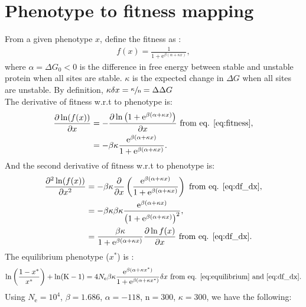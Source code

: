 \documentclass{article}
\newcommand{\e}{\mathrm{e}}
\newcommand{\Ne}{N_{\mathrm{e}}}
\newcommand{\Nsite}{\text{n}}
\newcommand{\Nstate}{\text{K}}
\newcommand{\x}{x}
\newcommand{\eq}{^{*}}
\newcommand{\dx}{\delta \x}
\begin{document}
\section*{Phenotype to fitness mapping}
From a given phenotype $\x$, define the fitness as :
\begin{gather}
 f(\x) = \frac{1}{1 + \e^{\beta(\alpha + \kappa \x)}}, \label{eq:fitness}
\end{gather}
where $\alpha = \Delta G_0 < 0$ is the difference in free energy between stable and unstable protein when all sites are stable. $\kappa$ is the expected change in $\Delta G$ when all sites are unstable. By definition, $\kappa \dx = \sfrac{\kappa}{\Nsite} = \Delta \Delta G $\\
The derivative of fitness w.r.t to phenotype is:
\begin{align}
 \frac{\partial \ln (f(\x))}{\partial \x}  & = - \frac{\partial \ln \left( 1 + \e^{\beta(\alpha + \kappa \x)} \right)}{\partial \x} \text{ from eq. \ref{eq:fitness}}, \\
 & = - \beta \kappa \frac{\e^{\beta(\alpha + \kappa \x)}}{1 + \e^{\beta(\alpha + \kappa \x)}} \label{eq:df_dx}.
\end{align}
And the second derivative of fitness w.r.t to phenotype is:
\begin{align}
\frac{\partial^2 \ln (f(\x))}{\partial {\x}^2} & = - \beta \kappa \frac{\partial}{\partial \x} \left( \frac{\e^{\beta(\alpha + \kappa \x)}}{1 + \e^{\beta(\alpha + \kappa \x)}} \right) \text{ from eq. \ref{eq:df_dx}}, \\
 & = - \beta \kappa  \beta \kappa \frac{\e^{\beta(\alpha + \kappa \x)}}{\left( 1 + \e^{\beta(\alpha + \kappa \x)}\right)^2}, \\
 & = \frac{\beta \kappa}{1 + \e^{\beta(\alpha + \kappa \x)}} \frac{ \partial \ln f(\x) }{\partial {\x}} \text{ from eq. \ref{eq:df_dx}} \label{eq:df2_dx2}.
\end{align}
The equilibrium phenotype ($\x\eq$) is :
\begin{gather}
\ln \left( \frac{1 - \x\eq}{\x\eq} \right) + \ln (\Nstate-1) = 4\Ne \beta \kappa \frac{\e^{\beta(\alpha + \kappa \x\eq)}}{1 + \e^{\beta(\alpha + \kappa \x\eq)}}  \dx   \text{ from eq. \ref{eq:equilibrium} and \ref{eq:df_dx}}.
\end{gather}
Using $\Ne=10^4$, $\beta=1.686$, $\alpha = -118$, $\Nsite=300$, $\kappa=300$, we have the following:
\end{document}
